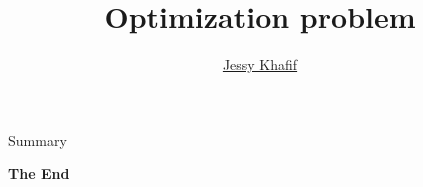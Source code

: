 \documentclass[aspectratio=43]{beamer}
\title{
    Optimization problem
} %
\author{
    \href{https://github.com/akhaten}{Jessy Khafif}
}
\begin{document}
    
    \frame{\titlepage}
    
    \begin{frame}{Summary}
        \tableofcontents
    \end{frame}
    

    
    
    
    
    

    \begin{frame}{}
        \centering
            \Huge\bfseries
        \textcolor{green_custom}{The End}
    \end{frame}
\end{document}
